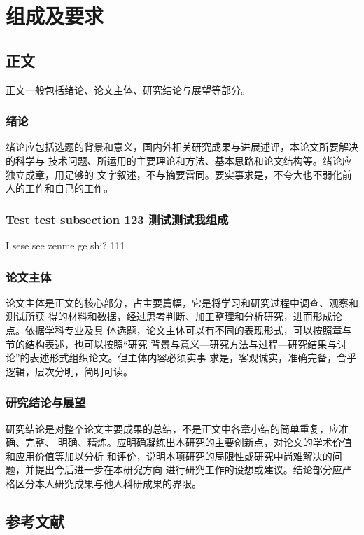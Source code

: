 \chapter{组成及要求}

\section{正文}

正文一般包括绪论、论文主体、研究结论与展望等部分。

\subsection{绪论}

绪论应包括选题的背景和意义，国内外相关研究成果与进展述评，本论文所要解决的科学与
技术问题、所运用的主要理论和方法、基本思路和论文结构等。绪论应独立成章，用足够的
文字叙述，不与摘要雷同。要实事求是，不夸大也不弱化前人的工作和自己的工作。

\subsection{Test test subsection 123 测试测试我组成}

I sese see zenme ge shi? 111

\subsection{论文主体}

论文主体是正文的核心部分，占主要篇幅，它是将学习和研究过程中调查、观察和测试所获
得的材料和数据，经过思考判断、加工整理和分析研究，进而形成论点。依据学科专业及具
体选题，论文主体可以有不同的表现形式，可以按照章与节的结构表述，也可以按照“研究
背景与意义—研究方法与过程—研究结果与讨论”的表述形式组织论文。但主体内容必须实事
求是，客观诚实，准确完备，合乎逻辑，层次分明，简明可读。

\subsection{研究结论与展望}

研究结论是对整个论文主要成果的总结，不是正文中各章小结的简单重复，应准确、完整、
明确、精炼。应明确凝练出本研究的主要创新点，对论文的学术价值和应用价值等加以分析
和评价，说明本项研究的局限性或研究中尚难解决的问题，并提出今后进一步在本研究方向
进行研究工作的设想或建议。结论部分应严格区分本人研究成果与他人科研成果的界限。

\section{参考文献}

